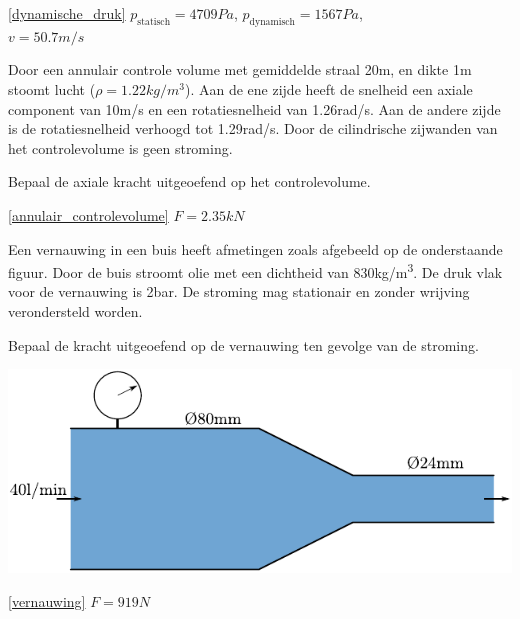 \begin{antwoord}{\ref{dynamische_druk}}
	$p_{\text{statisch}} = 4709\unit{Pa}$, $p_{\text{dynamisch}} = 1567\unit{Pa}$,\\ $v = 50.7\unit{m/s}$
\end{antwoord}
\begin{toepassing}
	\label{annulair_controlevolume}
Door een annulair controle volume met gemiddelde straal 20m, en dikte 1m  stoomt lucht ($\rho=1.22\unit{kg/m^3}$). Aan de ene zijde heeft de snelheid een axiale component van 10m/s en een rotatiesnelheid van 1.26rad/s. Aan de andere zijde is de rotatiesnelheid verhoogd tot 1.29rad/s. Door de cilindrische zijwanden van het controlevolume is geen stroming.

Bepaal de axiale kracht uitgeoefend op het controlevolume.
\end{toepassing}
\begin{antwoord}{\ref{annulair_controlevolume}}
	$F = 2.35\unit{kN}$
\end{antwoord}
\begin{toepassing}
	\label{vernauwing}
Een vernauwing in een buis heeft afmetingen zoals afgebeeld op de onderstaande figuur. Door de buis stroomt olie met een dichtheid van 830\unit{kg/m^3}. De druk vlak voor de vernauwing is 2\unit{bar}. De stroming mag stationair en zonder wrijving verondersteld worden.
		
Bepaal de kracht uitgeoefend op de vernauwing ten gevolge van de stroming.

	\centering
	\includegraphics{fig/behoudsvergelijkingen/vernauwing}
\end{toepassing}
\begin{antwoord}{\ref{vernauwing}}
	$F = 919\unit{N}$
\end{antwoord}
